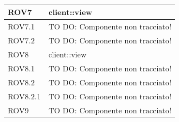 \begin{center}
\begin{longtable}{| p{4cm} | p{8cm} |}
\hline
ROV7 & client::view \\
\hline
ROV7.1 & TO DO: Componente non tracciato! \\
\hline
ROV7.2 & TO DO: Componente non tracciato! \\
\hline
ROV8 & client::view \\
\hline
ROV8.1 & TO DO: Componente non tracciato! \\
\hline
ROV8.2 & TO DO: Componente non tracciato! \\
\hline
ROV8.2.1 & TO DO: Componente non tracciato! \\
\hline
ROV9 & TO DO: Componente non tracciato! \\
\hline
\end{longtable}
\egroup
\end{center}
